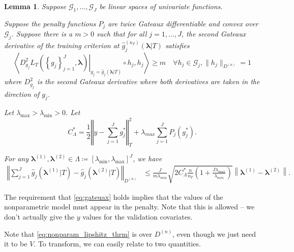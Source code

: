 \documentclass[12pt]{article} %
\newtheorem{lemma}{Lemma}
\theoremstyle{definition}
\begin{document}
\begin{lemma}
	\label{lemma:nonparam_smooth}
	Suppose $\mathcal{G}_1, ..., \mathcal{G}_J$ be linear spaces of univariate functions.
	
	Suppose the penalty functions $P_{j}$ are twice Gateaux differentiable and convex over $\mathcal{G}_j$.
	Suppose there is a $m > 0$ such that for all $j=1,...,J$, the second Gateaux derivative of the training criterion at $\hat{g}^{(n_T)}_j( \boldsymbol{\lambda} | T)$ satisfies
	\begin{equation}
	\left \langle 
	\left . D^2_{g_j} L_T \left ( \left \{ g_j \right \}_{j=1}^J, \boldsymbol{\lambda} \right ) \right |_{g_j= \hat{g}_j( \boldsymbol{\lambda} | T) }
	\circ h_j, h_j
	\right \rangle 
	\ge m
	\quad \forall h_j \in \mathcal{G}_j,  \|h_j \|_{D^{(n)}} = 1
	\label{eq:gateuax}
	\end{equation}
	where $D^2_{g_j}$ is the second Gateaux derivative where both derivatives are taken in the direction of $g_j$.
	
	Let $\lambda_{\max} > \lambda_{\min} > 0 $. Let
	\begin{equation}
	C_{\Lambda}^*=
	\frac{1}{2}\left\Vert y- \sum_{j=1}^J g^*_j\right\Vert _{T}^{2}
	+\lambda_{max}\sum_{j=1}^{J} P_{j}(g^*_j).
	\end{equation}
	
	For any $\boldsymbol{\lambda}^{(1)}, \boldsymbol{\lambda}^{(2)} \in \Lambda \coloneqq \left [ \lambda_{\min}, \lambda_{\max} \right ]^J$, we have
	\begin{align}
	\label{eq:nonparam_lipshitz_thrm}
	\left\Vert 
	\sum_{j=1}^J \hat{g}_j\left(\boldsymbol{\lambda}^{(1)} |T \right)-\hat{g}_j\left(\boldsymbol{\lambda}^{(2)} |T \right)\right\Vert _{D^{(n)}} & \le
	\frac{J}{m \lambda_{min}}\sqrt{2 C_{\Lambda}^* \frac{n}{n_{T}}\left(1+\frac{J\lambda_{max}}{\lambda_{min}}\right)}
	\left \|\boldsymbol{\lambda}^{(1)}-\boldsymbol{\lambda}^{(2)} \right \|.
	\end{align}
\end{lemma}

The requirement that \eqref{eq:gateuax} holds implies that the values of the nonparametric model must appear in the penalty.
Note that this is allowed -- we don't actually give the $y$ values for the validation covariates.

Note that \eqref{eq:nonparam_lipshitz_thrm} is over $D^{(n)}$, even though we just need it to be $V$.
To transform, we can easily relate to two quantities.
\end{document}
